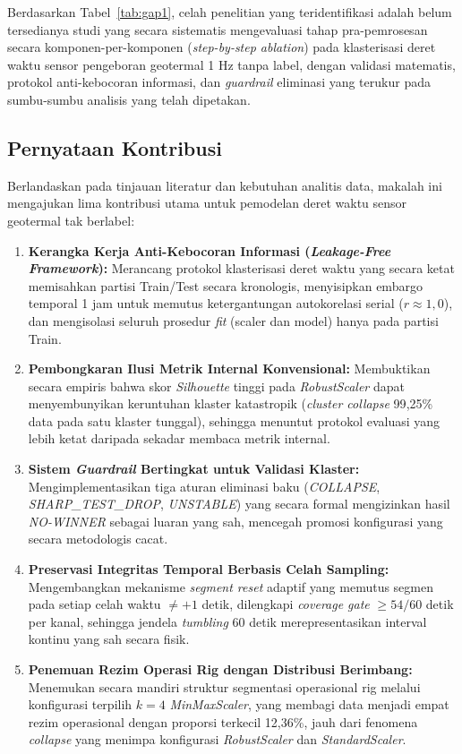 \documentclass[conference]{IEEEtran}
\begin{document}
Berdasarkan Tabel~\ref{tab:gap1}, celah penelitian yang teridentifikasi adalah belum tersedianya studi yang secara sistematis mengevaluasi tahap pra-pemrosesan secara komponen-per-komponen (\textit{step-by-step ablation}) pada klasterisasi deret waktu sensor pengeboran geotermal 1 Hz tanpa label, dengan validasi matematis, protokol anti-kebocoran informasi, dan \textit{guardrail} eliminasi yang terukur pada sumbu-sumbu analisis yang telah dipetakan.

\subsection{Pernyataan Kontribusi}
Berlandaskan pada tinjauan literatur dan kebutuhan analitis data, makalah ini mengajukan lima kontribusi utama untuk pemodelan deret waktu sensor geotermal tak berlabel:

\begin{enumerate}
\item \textbf{Kerangka Kerja Anti-Kebocoran Informasi (\textit{Leakage-Free Framework}):} Merancang protokol klasterisasi deret waktu yang secara ketat memisahkan partisi Train/Test secara kronologis, menyisipkan embargo temporal 1 jam untuk memutus ketergantungan autokorelasi serial ($r \approx 1{,}0$), dan mengisolasi seluruh prosedur \textit{fit} (scaler dan model) hanya pada partisi Train.

\item \textbf{Pembongkaran Ilusi Metrik Internal Konvensional:} Membuktikan secara empiris bahwa skor \textit{Silhouette} tinggi pada \textit{RobustScaler} dapat menyembunyikan keruntuhan klaster katastropik (\textit{cluster collapse} 99{,}25\% data pada satu klaster tunggal), sehingga menuntut protokol evaluasi yang lebih ketat daripada sekadar membaca metrik internal.

\item \textbf{Sistem \textit{Guardrail} Bertingkat untuk Validasi Klaster:} Mengimplementasikan tiga aturan eliminasi baku (\textit{COLLAPSE}, \textit{SHARP\_TEST\_DROP}, \textit{UNSTABLE}) yang secara formal mengizinkan hasil \textit{NO-WINNER} sebagai luaran yang sah, mencegah promosi konfigurasi yang secara metodologis cacat.

\item \textbf{Preservasi Integritas Temporal Berbasis Celah Sampling:} Mengembangkan mekanisme \textit{segment reset} adaptif yang memutus segmen pada setiap celah waktu $\ne +1$ detik, dilengkapi \textit{coverage gate} $\ge 54/60$ detik per kanal, sehingga jendela \textit{tumbling} 60 detik merepresentasikan interval kontinu yang sah secara fisik.

\item \textbf{Penemuan Rezim Operasi Rig dengan Distribusi Berimbang:} Menemukan secara mandiri struktur segmentasi operasional rig melalui konfigurasi terpilih $k=4$ \textit{MinMaxScaler}, yang membagi data menjadi empat rezim operasional dengan proporsi terkecil 12,36\%, jauh dari fenomena \textit{collapse} yang menimpa konfigurasi \textit{RobustScaler} dan \textit{StandardScaler}.
\end{enumerate}
\end{document}
